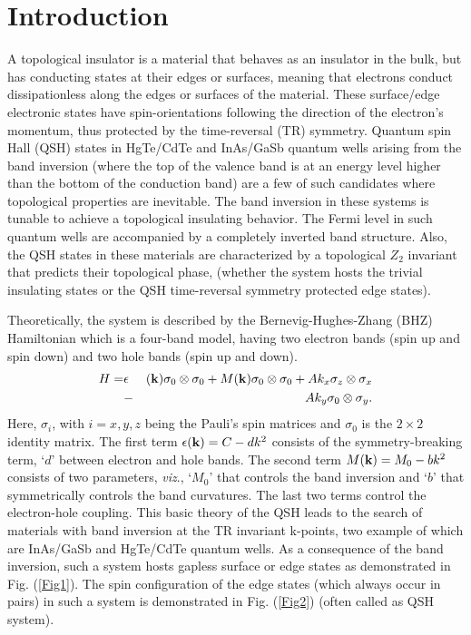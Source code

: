 \documentclass[prb,twocolumn]{revtex4-1}
\newcommand{\tens}{%
	\mathbin{\mathop{\otimes}}%
}
\begin{document}
\section{Introduction}
A topological insulator is a material that behaves as an insulator in the bulk, but has conducting states at their edges or surfaces, meaning that electrons conduct dissipationless along the edges or surfaces of the material\cite{topo,topo2}. These surface/edge electronic states have spin-orientations following the direction of the electron's momentum, thus protected by the time-reversal (TR) symmetry\cite{TR}. Quantum spin Hall (QSH) states in HgTe/CdTe \cite{ref1,ref2,ref3,ref4} and InAs/GaSb \cite{InAs1,InAs2,ref2,InAs4} quantum wells arising from the band inversion (where the top of the valence band is at an energy level higher than the bottom of the conduction band) are a few of such candidates where topological properties are inevitable. The band inversion in these systems is tunable to achieve a topological insulating behavior\cite{tune,tune2}. %
The Fermi level in such quantum wells are accompanied by a completely inverted band structure\cite{bhz,Hamil2}.
Also, the QSH states in these materials are characterized by a topological $Z_2$ invariant that predicts their topological phase, (whether the system hosts the trivial insulating states or the QSH time-reversal symmetry protected edge states).



Theoretically, the system is described by the Bernevig-Hughes-Zhang (BHZ) Hamiltonian which is a four-band model, having two electron bands (spin up and spin down) and two hole bands (spin up and down).\cite{bhz,Hamil2,TR,Hamil3,ref1,Hamil5,QSH}
\begin{eqnarray}\label{HamilB0}
H=&\epsilon&({\bf k})\sigma_0\tens\sigma_0+M({\bf k})\sigma_0\tens\sigma_0+A k_x\sigma_z\tens\sigma_x\nonumber\\&-&A k_y\sigma_0\tens\sigma_y.
\end{eqnarray}
Here, $\sigma_i$, with $i=x,y,z$ being the Pauli's spin matrices and $\sigma_0$ is the $2\times 2$ identity matrix. The first term $\epsilon({\bf k})=C-dk^2$ consists of the symmetry-breaking term, `$d$' between electron and hole bands. The second term $M({\bf k})=M_0-b k^2$ consists of two parameters, \textit{viz}., `$M_0$' that controls the band inversion and `$b$' that symmetrically controls the band curvatures. The last two terms control the electron-hole coupling. 
This basic theory of the QSH leads to the search of materials with band inversion at the TR invariant k-points, two example of which are InAs/GaSb and HgTe/CdTe quantum wells.
As a consequence of the band inversion, such a system hosts gapless surface or edge states as demonstrated in Fig. (\ref{Fig1}). The spin configuration of the edge states (which always occur in pairs) in such a system is demonstrated in Fig. (\ref{Fig2}) (often called as QSH system). 
\end{document}
